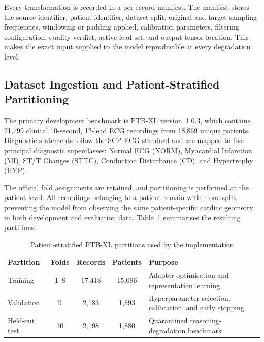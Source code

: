 \documentclass{ssnreview}
\begin{document}
Every transformation is recorded in a per-record manifest. The manifest stores the source
identifier, patient identifier, dataset split, original and target sampling frequencies,
windowing or padding applied, calibration parameters, filtering configuration, quality
verdict, active lead set, and output tensor location. This makes the exact input supplied to
the model reproducible at every degradation level.

\subsection{Dataset Ingestion and Patient-Stratified Partitioning}

The primary development benchmark is PTB-XL version~1.0.3, which contains 21,799
clinical 10-second, 12-lead ECG recordings from 18,869 unique patients. Diagnostic
statements follow the SCP-ECG standard and are mapped to five principal diagnostic
superclasses: Normal ECG (\textsc{NORM}), Myocardial Infarction (\textsc{MI}),
ST/T Changes (\textsc{STTC}), Conduction Disturbance (\textsc{CD}), and
Hypertrophy (\textsc{HYP}).

The official fold assignments are retained, and partitioning is performed at the patient
level. All recordings belonging to a patient remain within one split, preventing the model
from observing the same patient-specific cardiac geometry in both development and
evaluation data. Table~\ref{tab:ptbxl-splits} summarises the resulting partitions.

\begin{table}[H]
  \centering
  \caption{Patient-stratified PTB-XL partitions used by the implementation}
  \label{tab:ptbxl-splits}
  \begin{tabularx}{\textwidth}{@{}lccc>{\raggedright\arraybackslash}X@{}}
    \toprule
    \textbf{Partition} & \textbf{Folds} & \textbf{Records} &
    \textbf{Patients} & \textbf{Purpose} \\
    \midrule
    Training & 1--8 & 17,418 & 15,096 &
    Adapter optimisation and representation learning \\
    Validation & 9 & 2,183 & 1,893 &
    Hyperparameter selection, calibration, and early stopping \\
    Held-out test & 10 & 2,198 & 1,880 &
    Quarantined reasoning-degradation benchmark \\
    \bottomrule
  \end{tabularx}
\end{table}
\end{document}

